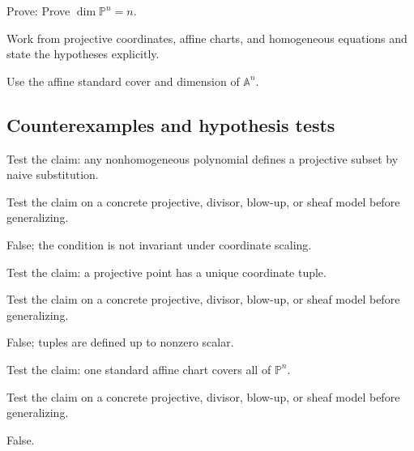 \begin{exercise}\label{exr:vi36-expand-09}
Prove: Prove $\dim\mathbb P^n=n$.
\end{exercise}
\begin{hint}
Work from projective coordinates, affine charts, and homogeneous equations and state the hypotheses explicitly.
\end{hint}
\begin{solution}
Use the affine standard cover and dimension of $\mathbb A^n$.
\end{solution}

\subsection*{Counterexamples and hypothesis tests}

\begin{exercise}\label{exr:vi36-expand-10}
Test the claim: any nonhomogeneous polynomial defines a projective subset by naive substitution.
\end{exercise}
\begin{hint}
Test the claim on a concrete projective, divisor, blow-up, or sheaf model before generalizing.
\end{hint}
\begin{solution}
False; the condition is not invariant under coordinate scaling.
\end{solution}

\begin{exercise}\label{exr:vi36-expand-11}
Test the claim: a projective point has a unique coordinate tuple.
\end{exercise}
\begin{hint}
Test the claim on a concrete projective, divisor, blow-up, or sheaf model before generalizing.
\end{hint}
\begin{solution}
False; tuples are defined up to nonzero scalar.
\end{solution}

\begin{exercise}\label{exr:vi36-expand-12}
Test the claim: one standard affine chart covers all of $\mathbb P^n$.
\end{exercise}
\begin{hint}
Test the claim on a concrete projective, divisor, blow-up, or sheaf model before generalizing.
\end{hint}
\begin{solution}
False.
\end{solution}

